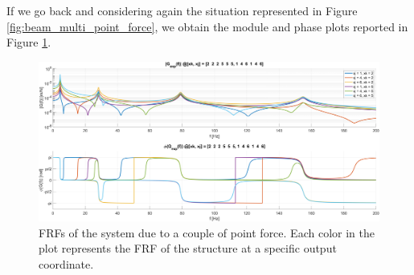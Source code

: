 If we go back and considering again the situation represented in Figure \ref{fig:beam_multi_point_force}, we obtain the module and phase plots reported in Figure \ref{fig:FRFs_multi_point_force}.

\begin{figure}[H]
    \centering
    \includegraphics[width=\textwidth]{img/MATLAB/Part_A/Experimental_FRF_MIMO.png}
    \caption{FRFs of the system due to a couple of point force. Each color in the plot represents the FRF of the structure at a specific output coordinate.}
    \label{fig:FRFs_multi_point_force}
\end{figure}
